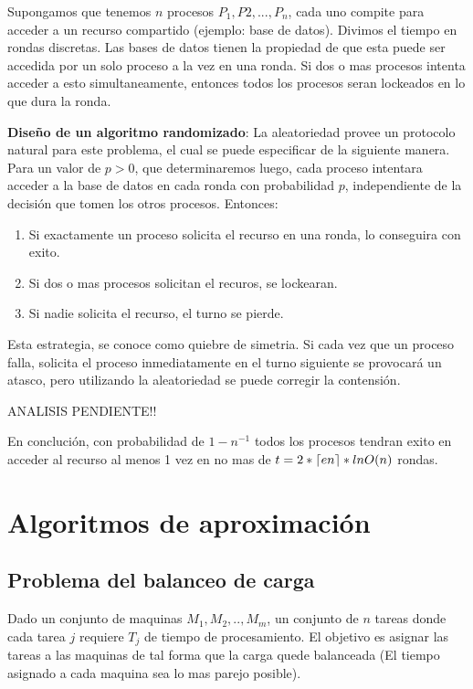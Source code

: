 \documentclass{article}
\DeclarePairedDelimiter{\ceil}{\lceil}{\rceil}
\begin{document}
Supongamos que tenemos \(n\) procesos \(P_1, P2,...,P_n\), cada uno compite para acceder a un 
recurso compartido (ejemplo: base de datos). Divimos el tiempo en rondas discretas. 
Las bases de datos tienen la propiedad de que esta puede ser accedida por un solo proceso a la vez
en una ronda. Si dos o mas procesos intenta acceder a esto simultaneamente, entonces todos los procesos
seran lockeados en lo que dura la ronda. 

\textbf{Diseño de un algoritmo randomizado}: La aleatoriedad provee un protocolo natural para este 
problema, el cual se puede especificar de la siguiente manera. Para un valor de \(p > 0\), que determinaremos
luego, cada proceso intentara acceder a la base de datos en cada ronda con probabilidad \(p\),
independiente de la decisión que tomen los otros procesos. Entonces:

\begin{enumerate}
    \item Si exactamente un proceso solicita el recurso en una ronda, lo conseguira con exito.
    \item Si dos o mas procesos solicitan el recuros, se lockearan.
    \item Si nadie solicita el recurso, el turno se pierde.
\end{enumerate}

Esta estrategia, se conoce como quiebre de simetria. Si cada vez que un proceso falla,
solicita el proceso inmediatamente en el turno siguiente se provocará un atasco, pero 
utilizando la aleatoriedad se puede corregir la contensión.


ANALISIS PENDIENTE!!


En conclución, con probabilidad de \(1-n^{-1}\) todos los procesos tendran exito en 
acceder al recurso al menos 1 vez en no mas de \(t=2*\ceil{en}*lnO(n)\) rondas.

\newpage
\section{Algoritmos de aproximación}

\subsection{Problema del balanceo de carga}

Dado un conjunto de maquinas \(M_1,M_2,..,M_m\), un conjunto de \(n\) tareas donde cada tarea \(j\)
requiere \(T_j\) de tiempo de procesamiento. El objetivo es asignar las tareas a las maquinas
de tal forma que la carga quede balanceada (El tiempo asignado a cada maquina sea lo mas parejo posible).
\end{document}

